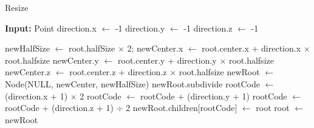 \documentclass[a4paper]{article}
\begin{document}
\begin{algorithm}
    \caption{Resize}\label{alg:octree resize}
    \begin{algorithmic}[1]
        \Statex \textbf{Input:} Point
        \State direction.x $\leftarrow$ -1
        \EndIf
        \State direction.y $\leftarrow$ -1
        \EndIf
        \State direction.z $\leftarrow$ -1
        \EndIf

        \State newHalfSize $\leftarrow$ root.halfSize $\times$ 2;
        \State newCenter.x $\leftarrow$ root.center.x + direction.x $\times$ root.halfsize
        \State newCenter.y $\leftarrow$ root.center.y + direction.y $\times$ root.halfsize
        \State newCenter.z $\leftarrow$ root.center.z + direction.z $\times$ root.halfsize
        \State newRoot $\leftarrow$ Node(NULL, newCenter, newHalfSize)
        \State newRoot.subdivide
        \State rootCode $\leftarrow$ (direction.x + 1) $\times$ 2
        \State rootCode $\leftarrow$ rootCode + (direction.y + 1)
        \State rootCode $\leftarrow$ rootCode + (direction.z + 1) $\div$ 2
        \State newRoot.children[rootCode] $\leftarrow$ root
        \State root $\leftarrow$ newRoot
        \EndWhile
    \end{algorithmic}
\end{algorithm}
\end{document}
